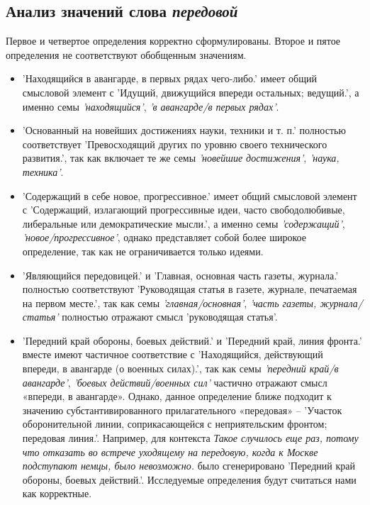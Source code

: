 \subsection*{Анализ значений слова \textit{передовой}}

Первое и четвертое определения корректно сформулированы.
Второе и пятое определения не соответствуют обобщенным значениям.

\begin{itemize}
    \item ’Находящийся в авангарде, в первых рядах чего-либо.’ имеет общий смысловой элемент с
’Идущий, движущийся впереди остальных; ведущий.’,
а именно семы \textit{’находящийся’}, \textit{’в авангарде/в первых рядах’}.

    \item ’Основанный на новейших достижениях науки, техники и т. п.’ полностью соответствует
’Превосходящий других по уровню своего технического развития.’,
так как включает те же семы \textit{’новейшие достижения’}, \textit{’наука, техника’}.

    \item ’Содержащий в себе новое, прогрессивное.’ имеет общий смысловой элемент с
’Содержащий, излагающий прогрессивные идеи, часто свободолюбивые, либеральные или демократические мысли.’,
а именно семы \textit{’содержащий’}, \textit{’новое/прогрессивное’}, однако представляет собой более широкое
определение, так как не ограничивается только идеями.

    \item ’Являющийся передовицей.’ и ’Главная, основная часть газеты, журнала.’ полностью соответствуют
’Руководящая статья в газете, журнале, печатаемая на первом месте.’, так как семы \textit{’главная/основная’}, \textit{’часть газеты, журнала/статья’} полностью отражают смысл ’руководящая статья’.
\end{itemize}

\begin{itemize}
    \item ’Передний край обороны, боевых действий.’ и ’Передний край, линия фронта.’
вместе имеют частичное соответствие с ’Находящийся, действующий впереди, в авангарде (о военных силах).’,
так как семы \textit{’передний край/в авангарде’}, \textit{’боевых действий/военных сил’} частично отражают смысл «впереди, в авангарде».
Однако, данное определение ближе подходит к значению субстантивированного прилагательного «передовая» –
’Участок оборонительной линии, соприкасающейся с неприятельским фронтом; передовая линия.’.
Например, для контекста \textit{Такое случилось еще раз, потому что отказать во встрече уходящему на передовую,
когда к Москве подступают немцы, было невозможно.} было сгенерировано ’Передний край обороны, боевых действий.’.
Исследуемые определения будут считаться нами как корректные.
\end{itemize}

